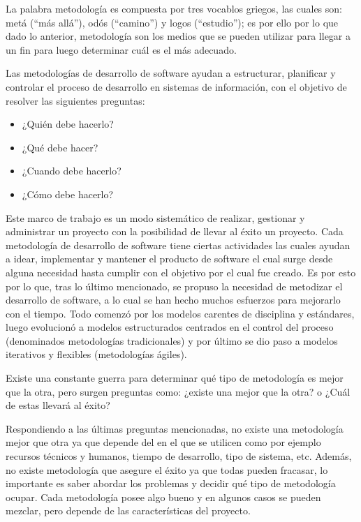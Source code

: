 La palabra metodología es compuesta por tres vocablos griegos, las cuales son: metá (``más allá''), odós (``camino'') y logos (``estudio''); es por ello por lo que dado lo anterior, metodología son los medios que se pueden utilizar para llegar a un fin para luego determinar cuál es el más adecuado.

Las metodologías de desarrollo de software ayudan a estructurar, planificar y controlar el proceso de desarrollo en sistemas de información, con el objetivo de resolver las siguientes preguntas:

\begin{itemize}
    \item ¿Quién debe hacerlo?
    \item ¿Qué debe hacer?
    \item ¿Cuando debe hacerlo?
    \item ¿Cómo debe hacerlo?
\end{itemize}

Este marco de trabajo es un modo sistemático de realizar, gestionar y administrar un proyecto con la posibilidad de llevar al éxito un proyecto. Cada metodología de desarrollo de software tiene ciertas actividades las cuales ayudan a idear, implementar y mantener el producto de software el cual surge desde alguna necesidad hasta cumplir con el objetivo por el cual fue creado. Es por esto por lo que, tras lo último mencionado, se propuso la necesidad de metodizar el desarrollo de software, a lo cual se han hecho muchos esfuerzos para mejorarlo con el tiempo. Todo comenzó por los modelos carentes de disciplina y estándares, luego evolucionó a modelos estructurados centrados en el control del proceso (denominados metodologías tradicionales) y por último se dio paso a modelos iterativos y flexibles (metodologías ágiles).

Existe una constante guerra para determinar qué tipo de metodología es mejor que la otra, pero surgen preguntas como: ¿existe una mejor que la otra? o ¿Cuál de estas llevará al éxito? 

Respondiendo a las últimas preguntas mencionadas, no existe una metodología mejor que otra ya que depende del en el que se utilicen como por ejemplo recursos técnicos y humanos, tiempo de desarrollo, tipo de sistema, etc. Además, no existe metodología que asegure el éxito ya que todas pueden fracasar, lo importante es saber abordar los problemas y decidir qué tipo de metodología ocupar. Cada metodología posee algo bueno y en algunos casos se pueden mezclar, pero depende de las características del proyecto.



